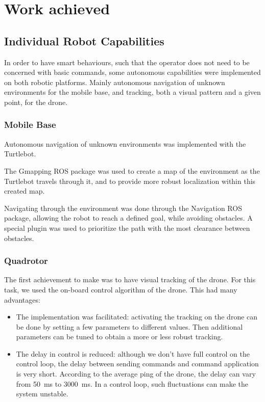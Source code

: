 \documentclass[11pt,a4paper]{article}
\begin{document}
\section{Work achieved}

\subsection{Individual Robot Capabilities}
In order to have smart behaviours, such that the operator does not need to be concerned with basic commands, some autonomous capabilities were implemented on both robotic platforms. Mainly autonomous navigation of unknown environments for the mobile base, and tracking, both a visual pattern and a given point, for the drone.

\subsubsection{Mobile Base}
Autonomous navigation of unknown environments was implemented with the Turtlebot.

The Gmapping ROS package was used to create a map of the environment as the Turtlebot travels through it, and to provide more robust localization within this created map. 

Navigating through the environment was done through the Navigation ROS package, allowing the robot to reach a defined goal, while avoiding obstacles. A special plugin was used to prioritize the path with the most clearance between obstacles. 



\subsubsection{Quadrotor}
The first achievement to make was to have visual tracking of the drone. For this task, we used 
the on-board control algorithm of the drone. This had many advantages: 
\begin{itemize}
\item The implementation was facilitated: activating the tracking on the drone can be done by 
setting a few parameters to different values. Then additional parameters can be tuned to
obtain a more or less robust tracking.

\item The delay in control is reduced: although we don't have full control on the control
loop, the delay between sending commands and command application is very short. According to
the average ping of the drone, the delay can vary from 50~ms to 3000~ms. In a control loop,
such fluctuations can make the system unstable.
\end{itemize}
\end{document}
